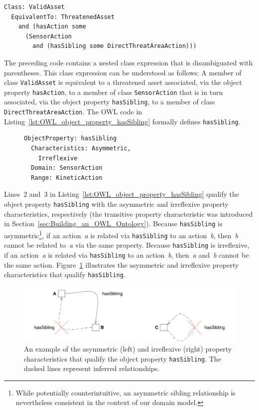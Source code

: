 \begin{lstlisting}[caption={OWL code for class \texttt{ValidAsset}},label=lst:OWL_class_ValidAsset]
Class: ValidAsset
  EquivalentTo: ThreatenedAsset
    and (hasAction some
      (SensorAction
        and (hasSibling some DirectThreatAreaAction)))
\end{lstlisting}

The preceding code contains a nested class expression that is disambiguated with parentheses. This class expression can be understood as follows: A member of class \texttt{ValidAsset} is equivalent to a threatened asset associated, via the object property \texttt{hasAction}, to a member of class \texttt{SensorAction} that is in turn associated, via the object property \texttt{hasSibling}, to a member of class \texttt{DirectThreatAreaAction}. The OWL code in Listing~\ref{lst:OWL_object_property_hasSibling} formally defines \texttt{hasSibling}.

\begin{figure}[ht]
\begin{lstlisting}[caption={OWL code for the object property \texttt{hasSibling}},label=lst:OWL_object_property_hasSibling]
ObjectProperty: hasSibling
  Characteristics: Asymmetric,
    Irreflexive
  Domain: SensorAction
  Range: KineticAction
\end{lstlisting}
\end{figure}

Lines~2 and~3 in Listing~\ref{lst:OWL_object_property_hasSibling} qualify the object property \texttt{hasSibling} with the asymmetric and irreflexive property characteristics, respectively (the transitive property characteristic was introduced in Section~\ref{sec:Building_an_OWL_Ontology}). Because \texttt{hasSibling} is asymmetric\footnote{While potentially counterintuitive, an asymmetric sibling relationship is nevertheless consistent in the context of our domain model.}, if an action~\emph{a} is related via \texttt{hasSibling} to an action~\emph{b}, then~\emph{b} cannot be related to~\emph{a} via the same property. Because \texttt{hasSibling} is irreflexive, if an action~\emph{a} is related via \texttt{hasSibling} to an action~\emph{b}, then~\emph{a} and~\emph{b} cannot be the same action. Figure~\ref{fig:asymmetric_and_irreflexive_properties} illustrates the asymmetric and irreflexive property characteristics that qualify \texttt{hasSibling}.

\begin{figure}[ht]
\centering
\includegraphics[scale=0.58]{img/asymmetric-irreflexive-properties.pdf}
\caption[Asymmetric and irreflexive properties]{An example of the asymmetric (left) and irreflexive (right) property characteristics that qualify the object property \texttt{hasSibling}. The dashed lines represent inferred relationships.}
\label{fig:asymmetric_and_irreflexive_properties}
\end{figure}

